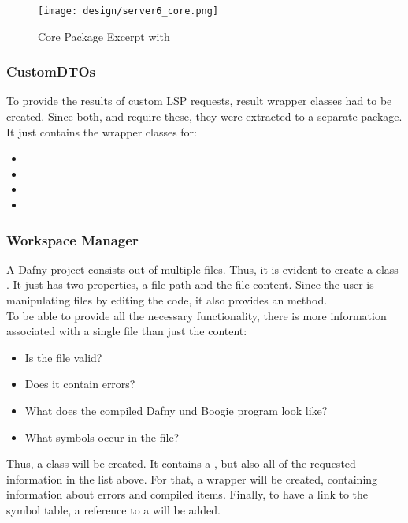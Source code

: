 \begin{figure}[H]
    \centering
    \texttt{[image: design/server6\_core.png]}
    \caption{Core Package Excerpt with }
    \label{fig:server_core}
\end{figure}

\subsubsection{CustomDTOs}
To provide the results of custom LSP requests, result wrapper classes had to be created.
Since both,  and  require these, they were extracted to a separate package.
It just contains the wrapper classes for:

\begin{multicols}{2}
\begin{itemize}
    \item {}
    \item {}
    \item {}
    \item {}
\end{itemize}
\end{multicols}

\subsubsection{Workspace Manager}
A Dafny project consists out of multiple  files.
Thus, it is evident to create a class .
It just has two properties, a file path and the file content.
Since the user is manipulating files by editing the code, it also provides an  method.\\

To be able to provide all the necessary functionality, there is more information associated with a single file than just the content:
\begin{itemize}
    \item Is the file valid?
    \item Does it contain errors?
    \item What does the compiled Dafny und Boogie program look like?
    \item What symbols occur in the file?
\end{itemize}

Thus, a class  will be created.
It contains a , but also all of the requested information in the list above.
For that, a wrapper  will be created, containing information about errors and compiled items.
Finally, to have a link to the symbol table, a reference to a  will be added.\\

